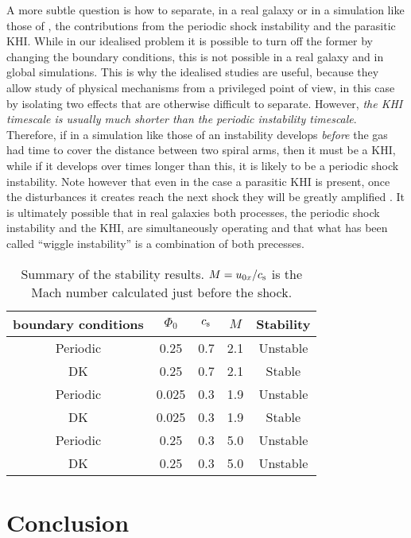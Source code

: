 \documentclass[useAMS,usenatbib]{mn2e}
\begin{document}
A more subtle question is how to separate, in a real galaxy or in a simulation like those of \cite{WadaKoda2004}, the contributions from the periodic shock instability and the parasitic KHI. While in our idealised problem it is possible to turn off the former by changing the boundary conditions, this is not possible in a real galaxy and in global simulations. This is why the idealised studies are useful, because they allow study of physical mechanisms from a privileged point of view, in this case by isolating two effects that are otherwise difficult to separate. However, \emph{the KHI timescale is usually much shorter than the periodic instability timescale}. Therefore, if in a simulation like those of \cite{WadaKoda2004} an instability develops \emph{before} the gas had time to cover the distance between two spiral arms, then it must be a KHI, while if it develops over times longer than this, it is likely to be a periodic shock instability. Note however that even in the case a parasitic KHI is present, once the disturbances it creates reach the next shock they will be greatly amplified \citep[see also][]{DobbsBonnell2006}. It is ultimately possible that in real galaxies both processes, the periodic shock instability and the KHI, are simultaneously operating and that what has been called ``wiggle instability'' is a combination of both precesses.

\begin{table}
\caption{Summary of the stability results. $M=u_{0x}/c_{\rm s}$ is the Mach number calculated just before the shock.} \label{table:summary}
\begin{center}
\begin{tabular}{ c c c c c } 
boundary conditions & $\Phi_0$ & $c_{\rm s}$ & $M$ & Stability \\
 \hline
Periodic & 0.25 & 0.7 & 2.1 & Unstable \\
DK & 0.25 & 0.7 & 2.1 & Stable  \\
Periodic & 0.025 & 0.3 & 1.9 & Unstable \\
DK & 0.025 & 0.3 & 1.9 & Stable  \\
Periodic & 0.25 & 0.3 & 5.0 & Unstable \\
DK & 0.25 & 0.3 & 5.0 & Unstable  \\
 \hline
\end{tabular}
\end{center}
\end{table}


\section{Conclusion} \label{sec:conclusion}
\end{document}
